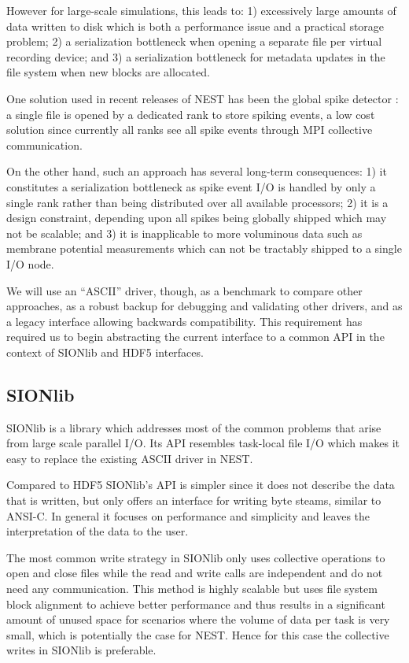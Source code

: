 \documentclass[]{YIC2015}
\begin{document}
However for large-scale simulations, this leads to: 1) excessively
large amounts of data written to disk which is both a performance
issue and a practical storage problem; 2) a serialization bottleneck
when opening a separate file per virtual recording device; and 3) a serialization
bottleneck for metadata updates in the file system when new blocks are
allocated.

One solution used in recent releases of NEST has been the global spike
detector \cite{gsd}: a single file is opened by a dedicated rank to
store spiking events, a low cost solution since currently all ranks
see all spike events through MPI collective communication.

On the other hand, such an approach has several long-term
consequences: 1) it constitutes a serialization bottleneck as spike
event I/O is handled by only a single rank rather than being
distributed over all available processors; 2) it is a design
constraint, depending upon all spikes being globally shipped which may
not be scalable; and 3) it is inapplicable to more voluminous data
such as membrane potential measurements which can not be tractably
shipped to a single I/O node.

We will use an ``ASCII'' driver, though, as a benchmark to compare
other approaches, as a robust backup for debugging and validating
other drivers, and as a legacy interface allowing backwards
compatibility. This requirement has required us to begin abstracting
the current interface to a common API in the context of SIONlib and
HDF5 interfaces.

\subsection{SIONlib}
\label{sec:sionlib}
SIONlib \cite{frings2009scalable} is a library which addresses most of
the common problems that arise from large scale parallel I/O. Its API
resembles task-local file I/O which makes it easy to replace the
existing ASCII driver in NEST.

Compared to HDF5 SIONlib's API is simpler since it does not describe
the data that is written, but only offers an interface for writing
byte steams, similar to ANSI-C. In general it focuses on performance
and simplicity and leaves the interpretation of the data to the user.

The most common write strategy in SIONlib only uses collective
operations to open and close files while the read and write calls are
independent and do not need any communication. This method is highly
scalable but uses file system block alignment to achieve better
performance and thus results in a significant amount of unused space
for scenarios where the volume of data per task is very small, which
is potentially the case for NEST. Hence for this case the collective
writes in SIONlib is preferable.
\end{document}
